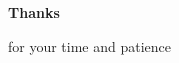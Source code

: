 \documentclass[12pt,xcolor=table]{beamer}
\begin{document}
\begin{frame}

\begin{center}
\begin{Huge}
\textbf{Thanks}
\end{Huge}
\end{center}
\begin{center}
\begin{Huge}
for your time and patience
\end{Huge}
\end{center}

\end{frame}
\end{document}
